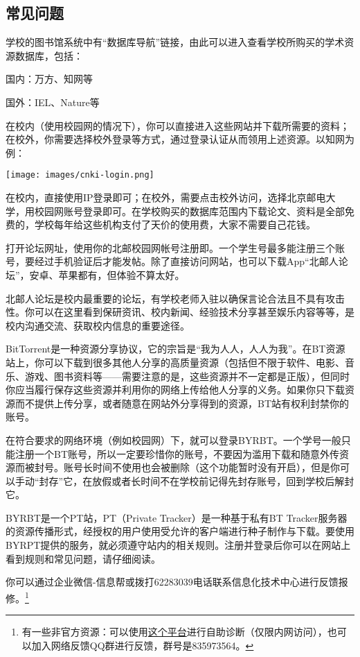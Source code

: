 \subsection*{常见问题}


学校的图书馆系统中有“数据库导航”链接，由此可以进入查看学校所购买的学术资源数据库，包括：

国内：万方、知网等

国外：IEL、Nature等

在校内（使用校园网的情况下），你可以直接进入这些网站并下载所需要的资料；在校外，你需要选择校外登录等方式，通过登录认证从而领用上述资源。以知网为例：

\begin{center}
    \texttt{[image: images/cnki-login.png]}
\end{center}

在校内，直接使用IP登录即可；在校外，需要点击校外访问，选择北京邮电大学，用校园网账号登录即可。在学校购买的数据库范围内下载论文、资料是全部免费的，学校每年给这些机构支付了天价的使用费，大家不需要自己花钱。


打开论坛网址，使用你的北邮校园网帐号注册即。一个学生号最多能注册三个账号，要经过手机验证后才能发帖。除了直接访问网站，也可以下载App“北邮人论坛”，安卓、苹果都有，但体验不算太好。

北邮人论坛是校内最重要的论坛，有学校老师入驻以确保言论合法且不具有攻击性。你可以在这里看到保研资讯、校内新闻、经验技术分享甚至娱乐内容等等，是校内沟通交流、获取校内信息的重要途径。


BitTorrent是一种资源分享协议，它的宗旨是“我为人人，人人为我”。在BT资源站上，你可以下载到很多其他人分享的高质量资源（包括但不限于软件、电影、音乐、游戏、图书资料等——需要注意的是，这些资源并不一定都是正版），但同时你应当履行保存这些资源并利用你的网络上传给他人分享的义务。如果你只下载资源而不提供上传分享，或者随意在网站外分享得到的资源，BT站有权利封禁你的账号。

在符合要求的网络环境（例如校园网）下，就可以登录BYRBT。一个学号一般只能注册一个BT账号，所以一定要珍惜你的账号，不要因为滥用下载和随意外传资源而被封号。账号长时间不使用也会被删除（这个功能暂时没有开启），但是你可以手动“封存”它，在放假或者长时间不在学校前记得先封存账号，回到学校后解封它。

BYRBT是一个PT站，PT（Private Tracker）是一种基于私有BT Tracker服务器的资源传播形式，经授权的用户使用受允许的客户端进行种子制作与下载。要使用BYRPT提供的服务，就必须遵守站内的相关规则。注册并登录后你可以在网站上看到规则和常见问题，请仔细阅读。


你可以通过企业微信-信息帮或拨打62283039电话联系信息化技术中心进行反馈报修。\footnote{有一些非官方资源：可以使用\href{https://buptnet.icu}{这个平台}进行自助诊断（仅限内网访问），也可以加入网络反馈QQ群进行反馈，群号是835973564。}
